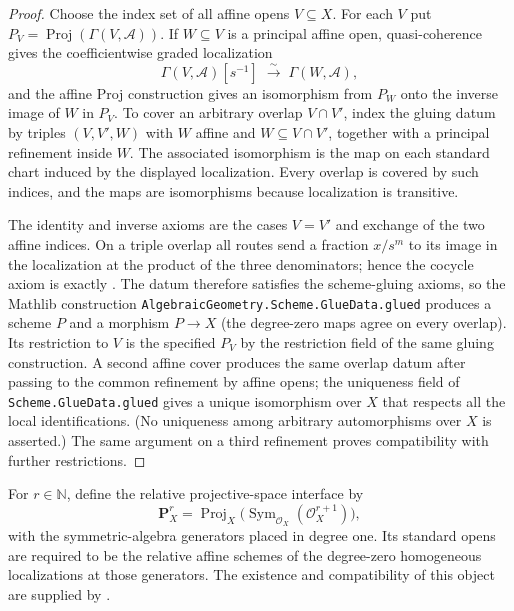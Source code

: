\begin{proof}
  Choose the index set of all affine opens $V\subseteq X$.  For each $V$ put
  $P_V=\operatorname{Proj}(\Gamma(V,\mathcal A))$.  If $W\subseteq V$ is a
  principal affine open, quasi-coherence gives the coefficientwise graded
  localization
  \[
    \Gamma(V,\mathcal A)[s^{-1}]\;\xrightarrow{\sim}\;
    \Gamma(W,\mathcal A),
  \]
  and the affine Proj construction gives an isomorphism from $P_W$ onto the
  inverse image of $W$ in $P_V$.  To cover an arbitrary overlap $V\cap V'$,
  index the gluing datum by triples $(V,V',W)$ with $W$ affine and
  $W\subseteq V\cap V'$, together with a principal refinement inside $W$.
  The associated isomorphism is the map on each standard chart induced by the
  displayed localization.  Every overlap is covered by such indices, and the
  maps are isomorphisms because localization is transitive.

  The identity and inverse axioms are the cases $V=V'$ and exchange of the two
  affine indices.  On a triple overlap all routes send a fraction
  $x/s^m$ to its image in the localization at the product of the three
  denominators; hence the cocycle axiom is exactly
  .  The datum therefore satisfies
  the scheme-gluing axioms, so the Mathlib
  construction \texttt{AlgebraicGeometry.Scheme.GlueData.glued} produces a
  scheme $P$ and a morphism $P\to X$ (the degree-zero maps agree on every
  overlap).  Its restriction to $V$ is the specified $P_V$ by the restriction
  field of the same gluing construction.  A second affine cover produces the
  same overlap datum after passing to the common refinement by affine opens;
  the uniqueness field of \texttt{Scheme.GlueData.glued} gives a unique
  isomorphism over $X$ that
  respects all the local identifications.  (No uniqueness among arbitrary
  automorphisms over $X$ is asserted.)  The same argument on a third
  refinement proves compatibility with further restrictions.
\end{proof}

\begin{definition}
  \label{def:nagata-relative-projective-space}

  For $r\in\mathbb N$, define the relative projective-space interface by
  \[
    \mathbf P^r_X
      =\operatorname{Proj}_X
        \bigl(\operatorname{Sym}_{\mathcal O_X}(\mathcal O_X^{r+1})\bigr),
  \]
  with the symmetric-algebra generators placed in degree one.  Its standard
  opens are required to be the relative affine schemes of the degree-zero
  homogeneous localizations at those generators.  The existence and
  compatibility of this object are supplied by
  .
\end{definition}

